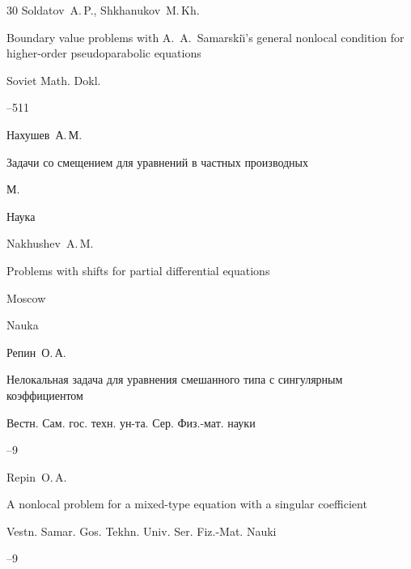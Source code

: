 \begin{thebibliography}{30}
\by Soldatov~A.\,P., Shkhanukov~M.\,Kh. 

\paper Boundary value problems with A.~A.~Samarski\u{\i}'s general nonlocal condition for higher-order pseudoparabolic equations

\jour Soviet Math. Dokl. 




–511 




\by Нахушев~А.\,М.

\book Задачи со смещением для уравнений в частных производных

\publaddr М.

\publ Наука




\misctransl

\by Nakhushev~A.\,M.

\book Problems with shifts for partial differential equations

\publaddr Moscow

\publ Nauka






\by Репин~О.\,А.

\paper Нелокальная задача для уравнения смешанного типа с сингулярным коэффициентом

\jour Вестн. Сам. гос. техн. ун-та. Сер. Физ.-мат. науки



--9

\misctransl

\by Repin~O.\,A.

\paper A nonlocal problem for a mixed-type equation with a singular coefficient

\jour  Vestn. Samar. Gos. Tekhn. Univ. Ser. Fiz.-Mat. Nauki



--9





\end{thebibliography}
